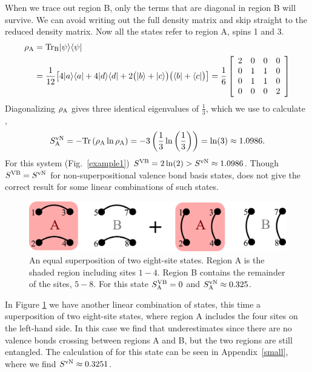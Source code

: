  When we trace out region B, only the terms that are diagonal in region B will survive. 
  We can avoid writing out the full density matrix and skip straight to the reduced density matrix.
  Now all the states refer to region A, spins 1 and 3.
  \begin{align}
\rho_{\rm A} &=  {\rm Tr_B} \lvert {\psi} \rangle\langle {\psi} \rvert \\ 
		&= \frac{1}{12} \big[ 
		4\lvert {a} \rangle \langle {a} \rvert + 4 \lvert {d} \rangle\langle {d} \rvert
		+ 2\big(\lvert {b} \rangle +\lvert {c} \rangle\big)\big(\langle {b} \rvert +\langle {c} \rvert\big)
		\big] =
		\frac{1}{6}
		\left[ \begin{array}{cccc}
		2 & 0&0&0\\
		0& 1& 1&0\\
		0& 1& 1&0\\
		0& 0& 0&2
		\end{array} \right]
 \end{align}
Diagonalizing $\rho_{\rm A}$ gives three identical eigenvalues of $\tfrac{1}{3}$, which we use to calculate \vN,
\begin{align}
S^{\text{vN}}_{\rm A} = - {\rm Tr} \left(\rho_{\rm A} \ln \rho_{\rm A} \right)= -3\left( \frac{1}{3} \ln \left( \frac{1}{3}\right)\right)
		= \ln(3) \approx 1.0986.
\end{align}
For this system (Fig.~\ref{example1}) $S^{\text{VB}} =2\ln(2) > S^{\text{vN}} \approx 1.0986$.
Though $S^{\text{VB}}=S^{\text{vN}}$ for non-superpositional valence bond basis states, \vb does not give the correct result for some linear combinations of such states.  

\begin{figure}
\centering 
\includegraphics[width=6in]{./figures/made/example2.pdf}
\caption[A superposition of two eight-site valence bond states]{An equal superposition of two eight-site states.
Region A is the shaded region including sites $1-4$.  
Region B contains the remainder of the sites, $5-8$.
For this state $S^{\text{VB}}_{\rm A}=0$ and $S^{\text{vN}}_{\rm A}\approx 0.325$.
\label{example2}
}
\end{figure}

In Figure \ref{example2} we have another linear combination of states, this time a superposition of two eight-site states, where region A includes the four sites on the left-hand side.  In this case we find that \vb underestimates \vn since there are no valence bonds crossing between regions A and B, but the two regions are still entangled.  The calculation of \vn for this state can be seen in Appendix~\ref{small}, where we find $S^{\text{vN}}\approx 0.3251$.



